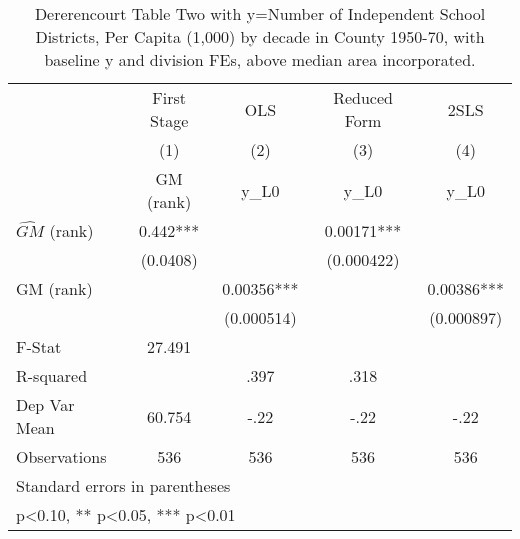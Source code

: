 \begin{table}[htbp]\centering
\def\sym#1{\ifmmode^{#1}\else\(^{#1}\)\fi}
\caption{Dererencourt Table Two with y=Number of Independent School Districts, Per Capita (1,000) by decade in County 1950-70, with baseline y and division FEs, above median area incorporated.}
\begin{tabular}{l*{4}{c}}
\toprule
                    & First Stage   &         OLS   &Reduced Form   &        2SLS   \\
                    &\multicolumn{1}{c}{(1)}&\multicolumn{1}{c}{(2)}&\multicolumn{1}{c}{(3)}&\multicolumn{1}{c}{(4)}\\
                    &\multicolumn{1}{c}{GM  (rank)}&\multicolumn{1}{c}{y\_L0}&\multicolumn{1}{c}{y\_L0}&\multicolumn{1}{c}{y\_L0}\\
\midrule
$\hat{GM}$ (rank)   &       0.442***&               &     0.00171***&               \\
                    &    (0.0408)   &               &  (0.000422)   &               \\
\addlinespace
GM  (rank)          &               &     0.00356***&               &     0.00386***\\
                    &               &  (0.000514)   &               &  (0.000897)   \\
\midrule
F-Stat              &      27.491   &               &               &               \\
R-squared           &               &        .397   &        .318   &               \\
Dep Var Mean        &      60.754   &        -.22   &        -.22   &        -.22   \\
Observations        &         536   &         536   &         536   &         536   \\
\bottomrule
\multicolumn{5}{l}{\footnotesize Standard errors in parentheses}\\
\multicolumn{5}{l}{\footnotesize * p<0.10, ** p<0.05, *** p<0.01}\\
\end{tabular}
\end{table}
